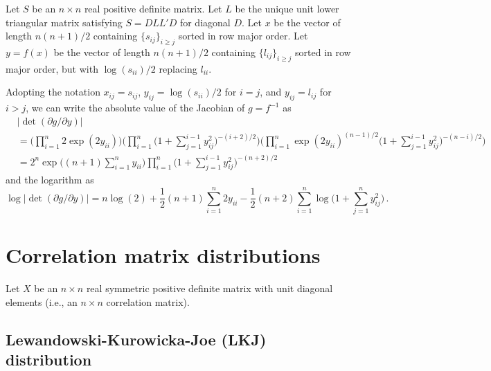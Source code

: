 \documentclass[12pt]{article}
\begin{document}
\setlength{\parskip}{5mm}
\setlength{\parindent}{0mm}

Let $S$ be an $n \times n$ real positive definite matrix.  Let $L$ be
the unique unit lower triangular matrix satisfying $S = D L L' D$ for
diagonal $D$.  Let $x$ be the vector of length $n (n + 1)/2$ containing
$\{s_{ij}\}_{i \geq j}$ sorted in row major order.  Let $y = f(x)$ be
the vector of length $n (n + 1)/2$ containing $\{l_{ij}\}_{i \geq j}$
sorted in row major order, but with $\log(s_{ii})/2$ replacing $l_{ii}$.

Adopting the notation
$x_{ij} = s_{ij}$,
$y_{ij} = \log(s_{ii}) / 2$ for $i = j$, and
$y_{ij} = l_{ij}$ for $i > j$,
we can write the absolute value of the Jacobian of $g = f^{-1}$ as
\begin{equation}
\begin{aligned}
  &\big|\det(\partial g/\partial y)\big| \\
&= \Big( \prod_{i=1}^{n} 2 \exp(2 y_{ii}) \Big) \Big( \prod_{i=1}^{n} \Big( 1 + \sum_{j=1}^{i-1} y_{ij}^{2} \Big)^{-(i+2)/2} \Big) \Big( \prod_{i=1}^{n} \exp(2 y_{ii})^{(n-1)/2} \Big( 1 + \sum_{j=1}^{i-1} y_{ij}^{2} \Big)^{-(n-i)/2} \Big) \\
&= 2^{n} \exp\Big((n + 1) \sum_{i=1}^{n} y_{ii}\Big) \prod_{i=1}^{n} \Big( 1 + \sum_{j=1}^{i-1} y_{ij}^{2} \Big)^{-(n+2)/2}
\end{aligned}
\end{equation}
and the logarithm as
\begin{equation}
\log\big|\det(\partial g/\partial y)\big| = n \log(2) + \frac{1}{2} (n + 1) \sum_{i=1}^{n} 2 y_{ii} - \frac{1}{2} (n + 2) \sum_{i=1}^{n} \log\Big( 1 + \sum_{j=1}^{n} y_{ij}^{2}\Big)\,.
\end{equation}

\newpage

\section{Correlation matrix distributions}

Let $X$ be an $n \times n$ real symmetric positive definite matrix
with unit diagonal elements (i.e., an $n \times n$ correlation matrix).

\subsection{Lewandowski-Kurowicka-Joe (LKJ) distribution}
\end{document}
